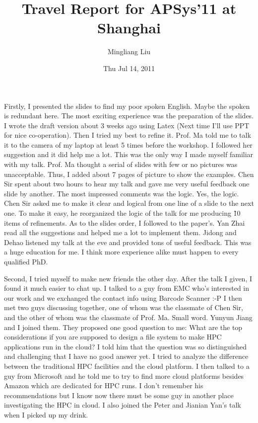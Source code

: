 \documentclass{article}
\begin{document}
\title{Travel Report for APSys'11 at Shanghai}
\author{Mingliang Liu}
\date{Thu Jul 14,  2011}

\maketitle

\par
Firstly, I presented the slides to find my poor spoken English. Maybe the
spoken is redundant here. The most exciting experience was the preparation of
the slides. I wrote the draft version about 3 weeks ago using Latex (Next time
I'll use PPT for nice co-operation). Then I tried my best to refine it.  Prof.
Ma told me to talk it to the camera of my laptop at least 5 times before the
workshop. I followed her suggestion and it did help me a lot. This was the
only way I made myself familiar with my talk. Prof. Ma thought a serial of
slides with few or no pictures was unacceptable. Thus, I added about 7 pages
of picture to show the examples. Chen Sir spent about two hours to hear my
talk and gave me very useful feedback one slide by another. The most impressed
comments was the logic. Yes, the logic. Chen Sir asked me to make it clear and
logical from one line of a slide to the next one. To make it easy, he
reorganized the logic of the talk for me producing \~10 items of
refinements.  As to the slides order, I followed to the paper's. Yan Zhai read
all the suggestions and helped me a lot to implement them. Jidong and Dehao
listened my talk at the eve and provided tons of useful feedback. This was a
huge education for me. I think more experience alike must happen to every
qualified PhD.

\par
Second, I tried myself to make new friends the other day. After the talk I
given, I found it much easier to chat up. I talked to a guy from EMC who's
interested in our work and we exchanged the contact info using Barcode Scanner
:-P I then met two guys discussing together, one of whom was the classmate of
Chen Sir, and the other of whom was the classmate of Prof.  Ma. Small word.
Yunyun Jiang and I joined them. They proposed one good question to me: What
are the top considerations if you are supposed to design a file system to make
HPC applications run in the cloud? I told him that the question was so
distinguished and challenging that I have no good answer yet.  I tried to
analyze the difference between the traditional HPC facilities and the cloud
platform. I then talked to a guy from Microsoft and he told me to try to find
more cloud platforms besides Amazon which are dedicated for HPC runs. I don't
remember his recommendations but I know now there must be some guy in another
place investigating the HPC in cloud. I also joined the Peter and Jianian
Yan's talk when I picked up my drink.
\end{document}
